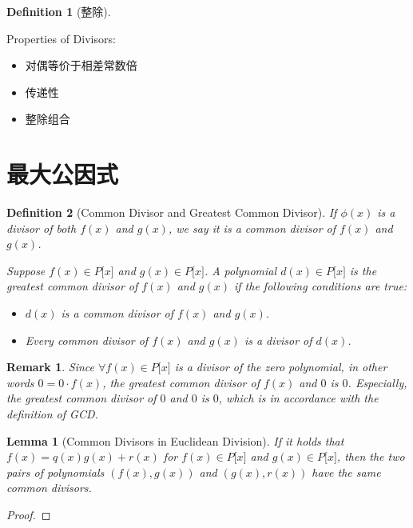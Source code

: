 \documentclass[onecolumn]{ctexart}
\newtheorem{definition}{Definition}
\newtheorem{lemma}{Lemma}
\newtheorem{remark}{Remark}
\begin{document}
\begin{definition}[整除]
  
\end{definition}

Properties of Divisors:
\begin{itemize}
  \item 对偶等价于相差常数倍
  \item 传递性
  \item 整除组合
\end{itemize}

\section{最大公因式}

\begin{definition}[Common Divisor and Greatest Common Divisor]
  If $\phi(x)$ is a divisor of both $f(x)$ and $g(x)$, we say it is a common 
  divisor of $f(x)$ and $g(x)$.

  Suppose $f(x) \in P\lbrack x \rbrack$ and $g(x) \in P\lbrack x \rbrack$. A 
  polynomial $d(x) \in P\lbrack x \rbrack$ is the greatest common divisor of 
  $f(x)$ and $g(x)$ if the following conditions are true:
  \begin{itemize}
    \item $d(x)$ is a common divisor of $f(x)$ and $g(x)$.
    \item Every common divisor of $f(x)$ and $g(x)$ is a divisor of $d(x)$.
  \end{itemize}
\end{definition}
\begin{remark}
  Since $\forall f(x) \in P\lbrack x \rbrack$ is a divisor of the zero 
  polynomial, in other words $0 = 0 \cdot f(x)$, the greatest common divisor of 
  $f(x)$ and $0$ is $0$. Especially, the greatest common divisor of $0$ and $0$ 
  is $0$, which is in accordance with the definition of GCD.
\end{remark}

\begin{lemma}[Common Divisors in Euclidean Division]
  If it holds that $f(x) = q(x)g(x) + r(x)$ for $f(x) \in P\lbrack x \rbrack$ 
  and $g(x) \in P\lbrack x \rbrack$, then the two pairs of polynomials $(f(x), 
  g(x))$ and $(g(x), r(x))$ have the same common divisors.
\end{lemma}
\begin{proof}
  
\end{proof}
\end{document}
